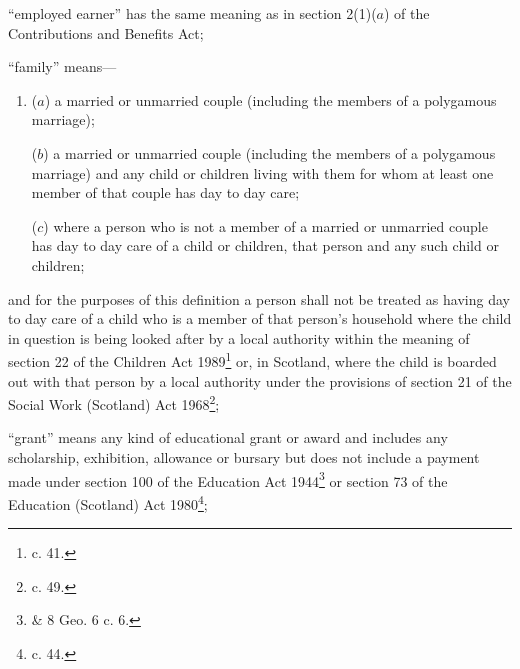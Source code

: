 \documentclass[a4paper]{article}
\begin{document}
\begin{enumerate}
“employed earner” has the same meaning as in section 2(1)($a$) of the Contributions and Benefits Act;

%

“family” means—
\begin{enumerate}\item[]
($a$) a married or unmarried couple (including the members of a polygamous marriage);

($b$) a married or unmarried couple (including the members of a polygamous marriage) and any child or children living with them for whom at least one member of that couple has day to day care;

($c$) where a person who is not a member of a married or unmarried couple has day to day care of a child or children, that person and any such child or children;
\end{enumerate}
and for the purposes of this definition a person shall not be treated as having day to day care of a child who is a member of that person’s household where the child in question is being looked after by a local authority within the meaning of section 22 of the Children Act 1989\footnote{ c. 41.} or, in Scotland, where the child is boarded out with that person by a local authority under the provisions of section 21 of the Social Work (Scotland) Act 1968\footnote{ c. 49.};

“grant” means any kind of educational grant or award and includes any scholarship, exhibition, allowance or bursary but does not include a payment made under section 100 of the Education Act 1944\footnote{ \& 8 Geo. 6 c. 6.} or section 73 of the Education (Scotland) Act 1980\footnote{ c. 44.};


\end{enumerate}
\end{document}
